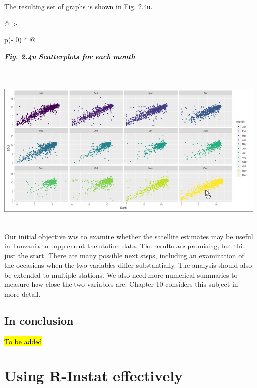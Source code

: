 \documentclass[
  letterpaper,
  DIV=11,
  numbers=noendperiod]{scrreprt}
\begin{document}
The resulting set of graphs is shown in Fig. 2.4u.

\begin{longtable}[]{@{}
  >{\raggedright\arraybackslash}p{(\columnwidth - 0\tabcolsep) * }@{}}
\toprule\noalign{}
\begin{minipage}[b]{\linewidth}\raggedright
\textbf{\emph{Fig. 2.4u Scatterplots for each month}}
\end{minipage} \\
\midrule\noalign{}
\endhead
\bottomrule\noalign{}
\endlastfoot
\includegraphics[width=6.13145in,height=3.05146in]{figures/Fig2.4u.png} \\
\end{longtable}

Our initial objective was to examine whether the satellite estimates may
be useful in Tanzania to supplement the station data. The results are
promising, but this just the start. There are many possible next steps,
including an examination of the occasions when the two variables differ
substantially. The analysis should also be extended to multiple
stations. We also need more numerical summaries to measure how close the
two variables are. Chapter 10 considers this subject in more detail.

\section{In conclusion}\label{in-conclusion}

\hl{To be added}


\chapter{Using R-Instat effectively}\label{using-r-instat-effectively}
\end{document}
